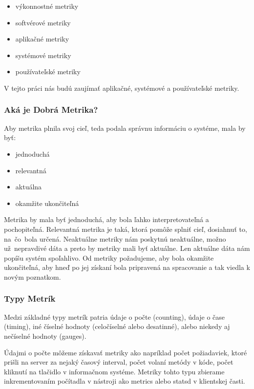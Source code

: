 \documentclass[a4paper, usesections, upjsfrontpage, disablespecwarning, thesismargins, thesislinespacing]{rnthesissvk}
\begin{document}
\begin{itemize}
	\item výkonnostné metriky
	\item softvérové metriky
	\item aplikačné metriky
	\item systémové metriky
	\item používateľské metriky
\end{itemize}

V tejto práci nás budú zaujímať aplikačné, systémové a používateľské metriky.

\subsubsection{Aká je Dobrá Metrika?}

Aby metrika plnila svoj cieľ, teda podala správnu informáciu o systéme, mala by byť:
\begin{itemize}
	\item jednoduchá
	\item relevantná
	\item aktuálna
	\item okamžite ukončiteľná
\end{itemize}

Metrika by mala byť jednoduchá, aby bola ľahko interpretovateľná a pochopiteľná.
Relevantná metrika je taká, ktorá pomôže splniť cieľ, dosiahnuť to, na~čo~bola určená.
Neaktuálne metriky nám poskytnú neaktuálne, možno už~nep\-ravdivé dáta a preto by metriky mali byť aktuálne. 
Len aktuálne dáta nám popíšu systém spoľahlivo.
Od metriky požadujeme, aby bola okamžite ukončiteľná, aby hneď po jej získaní bola pripravená na spracovanie a tak viedla k novým poznatkom.

\subsubsection{Typy Metrík}

Medzi základné typy metrík patria údaje o počte (counting), údaje o čase (timing), iné číselné hodnoty (celočíselné alebo desatinné), alebo niekedy aj nečíselné hodnoty (gauges). 

Údajmi o počte môžeme získavať metriky ako napríklad počet požiadaviek, ktoré prišli na server za nejaký časový interval, počet volaní metódy v kóde, počet kliknutí na tlačidlo v informačnom systéme. Metriky tohto typu zbierame inkrementovaním počítadla v nástroji ako metrics alebo statsd v klientskej časti.
\end{document}

